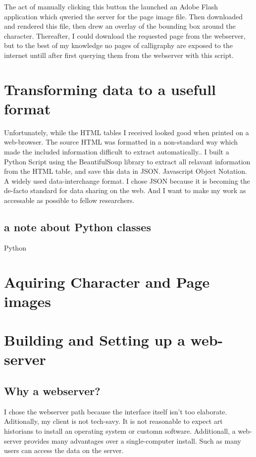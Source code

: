 The act of manually clicking this button the launched an Adobe Flash application which qweried the server for the page image file.  Then downloaded and rendered this file, then drew an overlay of the bounding box around the character.  Thereafter, I could download the requested page from the webserver, but to the best of my knowledge no pages of calligraphy are exposed to the internet untill after first querying them from the webserver with this script.


\section{Transforming data to a usefull format}

Unfortunately, while the HTML tables I received looked good when printed on a web-browser.  The source HTML was formatted in a non-standard way which made the included information difficult to extract automatically..  I built a Python Script using the BeautifulSoup library to extract all relavant information from the HTML table, and save this data in JSON.  Javascript Object Notation.  A widely used data-interchange format.  I chose JSON because it is becoming the de-facto standard for data sharing on the web.  And I want to make my work as accessable as possible to fellow researchers.

\subsection{a note about Python classes}

Python 



\section{Aquiring Character and Page images}


\section{Building and Setting up a web-server}

\subsection{Why a webserver?}

I chose the webserver path because the interface itself isn't too elaborate.  Aditionally, my client is not tech-savy.  It is not reasonable to expect art historians to install an operating system or customn software.  Additionall, a web-server provides many advantages over a single-computer install.  Such as many users can access the data on the server.


